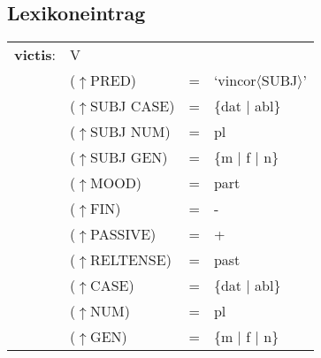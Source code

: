 \documentclass[12pt,a4paper]{article}
\begin{document}


\subsection{Lexikoneintrag}
\begin{singlespace}
\begin{tabular}{ l  l  l  l  } 
\textbf{victis}: & \: V \\
$\qquad$ & \:  ($\uparrow$PRED) & = & `vincor$\langle$SUBJ$\rangle$'\\
$\qquad$ & \: ($\uparrow$SUBJ CASE) & = & \{dat $\mid$ abl\} \\
$\qquad$ & \:  ($\uparrow$SUBJ NUM) & = & pl \\
$\qquad$ & \: ($\uparrow$SUBJ GEN) & = & \{m $\mid$ f $\mid$ n\} \\
$\qquad$ & \:  ($\uparrow$MOOD) & = & part\\
$\qquad$ & \:  ($\uparrow$FIN) & = & - \\
$\qquad$ & \: ($\uparrow$PASSIVE) & = & + \\
$\qquad$ & \: ($\uparrow$RELTENSE) & = & past \\
$\qquad$ & \: ($\uparrow$CASE) & = & \{dat $\mid$ abl\} \\
$\qquad$ & \:  ($\uparrow$NUM) & = & pl \\
$\qquad$ & \: ($\uparrow$GEN) & = & \{m $\mid$ f $\mid$ n\} \\
\end{tabular}
\newline
\newline
\end{singlespace}
\end{document}
